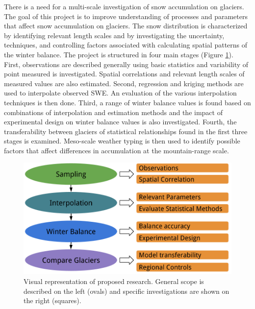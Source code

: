 \documentclass{sfuthesis}
\begin{document}
There is a need for a multi-scale investigation of snow accumulation on glaciers. The goal of this project is to improve understanding of processes and parameters that affect snow accumulation on glaciers. The snow distribution is characterized by identifying relevant length scales and by investigating the uncertainty, techniques, and controlling factors associated with calculating spatial patterns of the winter balance.  The project is structured in four main stages (Figure \ref{fig:flowchart_project}). First, observations are described generally using basic statistics and variability of point measured is investigated. Spatial correlations and relevant length scales of measured values are also estimated. Second, regression and kriging methods are used to interpolate observed SWE. An evaluation of the various interpolation techniques is then done. Third, a range of winter balance values is found based on combinations of interpolation and estimation methods and the impact of experimental design on winter balance values is also investigated. Fourth, the transferability between glaciers of statistical relationships found in the first three stages is examined. Meso-scale weather typing is then used to identify possible factors that affect differences in accumulation at the mountain-range scale.

 \begin{figure}
           \includegraphics[width = \textwidth]{MastersFlow.png}
       \caption{Visual representation of proposed research. General scope is described on the left (ovals) and specific investigations are shown on the right (squares).}
       \label{fig:flowchart_project}
\end{figure}
 
\end{document}
